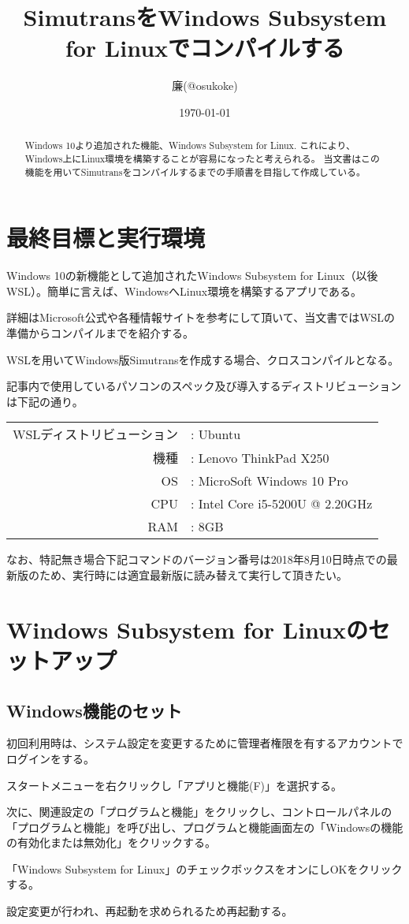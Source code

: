 \documentclass[autodetect-engine,dvipdfmx-if-dvi,ja=standard,a4j]{bxjsarticle}
\title{SimutransをWindows Subsystem for Linuxでコンパイルする}
\author{廉(@osukoke)}
\date{\today}
\begin{document}
	\maketitle
	\begin{abstract}
		Windows 10より追加された機能、Windows Subsystem for Linux.
		これにより、Windows上にLinux環境を構築することが容易になったと考えられる。
		当文書はこの機能を用いてSimutransをコンパイルするまでの手順書を目指して作成している。
	\end{abstract}
	\section{最終目標と実行環境}
		Windows 10の新機能として追加されたWindows Subsystem for Linux（以後WSL）。簡単に言えば、WindowsへLinux環境を構築するアプリである。\par \noindent
		詳細はMicrosoft公式や各種情報サイトを参考にして頂いて、当文書ではWSLの準備からコンパイルまでを紹介する。\par
		WSLを用いてWindows版Simutransを作成する場合、クロスコンパイルとなる。\par
		記事内で使用しているパソコンのスペック及び導入するディストリビューションは下記の通り。\par\noindent
		\begin{center}	
			\begin{tabular}{rl}
				WSLディストリビューション & : Ubuntu\\
				機種 & : Lenovo ThinkPad X250\\
				OS & : MicroSoft Windows 10 Pro\\
				CPU & : Intel Core i5-5200U @ 2.20GHz\\
				RAM & : 8GB\\
			\end{tabular}
		\end{center}
	\par
		なお、特記無き場合下記コマンドのバージョン番号は2018年8月10日時点での最新版のため、実行時には適宜最新版に読み替えて実行して頂きたい。\par
	\section{Windows Subsystem for Linuxのセットアップ}
		\subsection{Windows機能のセット}
			初回利用時は、システム設定を変更するために管理者権限を有するアカウントでログインをする。\par\noindent
			スタートメニューを右クリックし「アプリと機能(F)」を選択する。\par
			次に、関連設定の「プログラムと機能」をクリックし、コントロールパネルの「プログラムと機能」を呼び出し、プログラムと機能画面左の「Windowsの機能の有効化または無効化」をクリックする。\par\noindent
			「Windows Subsystem for Linux」のチェックボックスをオンにしOKをクリックする。\par
			設定変更が行われ、再起動を求められるため再起動する。
\end{document}
